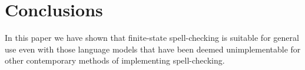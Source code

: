 \documentclass[11pt]{article}
\begin{document}
\section{Conclusions}
\label{sec:conclusions}
In this paper we have shown that finite-state spell-checking is suitable for
general use even with those language models that have been deemed unimplementable
for other contemporary methods of implementing spell-checking.





\end{document}
